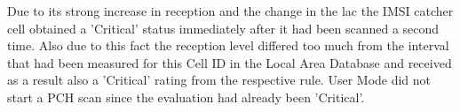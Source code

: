 Due to its strong increase in reception and the change in the \gls{lac} the IMSI catcher cell obtained a 'Critical' status immediately after it had been scanned a second time.
Also due to this fact the reception level differed too much from the interval that had been measured for this Cell ID  in the Local Area Database and received as a result also a 'Critical' rating from the respective rule.
User Mode did not start a PCH scan since the evaluation had already been 'Critical'.